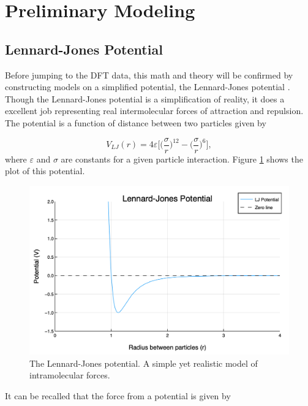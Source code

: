 \section{Preliminary Modeling}\label{Sect:modelPrep}

\subsection{Lennard-Jones Potential}\label{Sect:LJPotential}
Before jumping to the DFT data, this math and theory will be confirmed by constructing models on a simplified potential, the Lennard-Jones potential \cite{LJ-potential}. Though the Lennard-Jones potential is a simplification of reality, it does a excellent job representing real intermolecular forces of attraction and repulsion. The potential is a function of distance between two particles given by

\begin{equation} \label{eq:LJ}
V_{LJ}(r) = 4\varepsilon \bigg[\Big(\frac{\sigma}{r}\Big)^{12} - \Big(\frac{\sigma}{r}\Big)^6\bigg],
\end{equation}
where $\varepsilon$ and $\sigma$ are constants for a given particle interaction. Figure \ref{fig:LJ} shows the plot of this potential.

\begin{figure}[h]
\includegraphics[scale = 0.4]{Figures/LJPotential}
\caption{The Lennard-Jones potential. A simple yet realistic model of intramolecular forces.
\label{fig:LJ}} 
\end{figure}

\par It can be recalled that the force from a potential is given by

